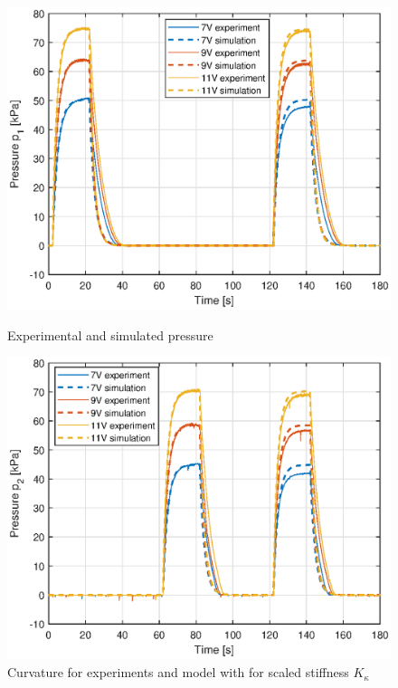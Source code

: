 \begin{figure}[H] 
    \begin{minipage}[b]{0.49\linewidth}
     \centering
    \includegraphics[width=\linewidth]{Figures/Chapter5/paramp1.eps} 
    \caption{Experimental and simulated pressure } 
    \label{fig5:p1} 
       \end{minipage} 
    \begin{minipage}[b]{0.49\linewidth}
     \centering
    \includegraphics[width=\linewidth]{Figures/Chapter5/paramp2.eps} 
    \caption{Curvature for experiments and model with for scaled stiffness $K_\kappa$ } 
    \label{fig5:p2} 
    \end{minipage} 
\end{figure}




